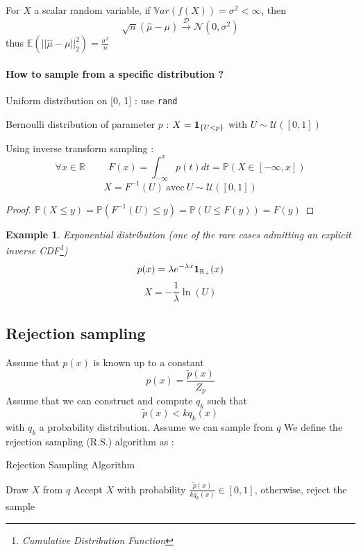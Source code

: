 \documentclass[12pt]{report}
\newcommand{\esp}{\mathbb{E}}
\newcommand{\var}{\mathbb{V}ar}
\newcommand{\p}{\mathbb{P}}
\newcommand{\R}{\mathbb{R}}
\newtheorem{example}{Example}[section]
\begin{document}
\begin{proposition}
For $X$ a scalar random variable, if $\var(f(X)) = \sigma^2 < \infty$, then
\[
  \sqrt{n}(\hat{\mu} - \mu) \overset{\mathcal{D}}{\longrightarrow} \mathcal{N}(0, \sigma^2)
\]
thus $\esp(||\hat{\mu} - \mu||^2_2) = \frac{\sigma^2}{n}$
\end{proposition}

\paragraph{How to sample from a specific distribution ?}

\BNUM
\item Uniform distribution on [0, 1] : use \texttt{rand}
\item Bernoulli distribution of parameter $p$ : $X = \mathbf 1_{\lbrace U <p\rbrace}$ with $U \sim \mathcal{U}([0, 1])$
\item Using inverse transform sampling :
$$\forall x \in \R \hspace{1cm} F(x) = \int_{-\infty}^x p(t)dt = \p(X \in [-\infty, x])$$
$$X = F^{-1}(U)\ \text{avec}\ U \sim \mathcal{U}([0, 1])$$
\begin{proof}
$\p(X \leq y) = \p( F^{-1}(U) \leq y) = \p(U \leq F(y)) = F(y)$
\end{proof}
\begin{example} Exponential distribution (one of the rare cases admitting an explicit inverse CDF\footnote{Cumulative Distribution Function})
$$p(x) = \lambda e^{-\lambda x} \ones_{\R_+}(x)$$
$$X = - \frac{1}{\lambda}\ln (U)$$
\end{example}
\ENUM

\subsection{Rejection sampling} 
Assume that $p(x)$ is known up to a constant \[
	p(x) = \frac{\tilde{p}(x)}{Z_p}
\]
Assume that we can construct and compute $q_k$ such that \[
	\tilde{p}(x) < kq_k(x)
\] with $q_k$ a probability distribution.
Assume we can sample from $q$
We define the rejection sampling (R.S.) algorithm as :
\FloatBarrier
\begin{algorithm}
\caption{Rejection Sampling Algorithm}\label{RS}
\begin{algorithmic}[1]
\State Draw $X$ from $q$
\State Accept $X$ with probability $\frac{\tilde{p}(x)}{kq_k(x)} \in [0,1]$, otherwise, reject the sample
\end{algorithmic}
\end{algorithm}
\FloatBarrier
\end{document}
